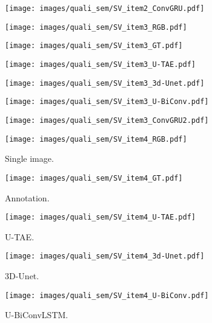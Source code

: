 \begin{figure*}
\begin{subfigure}{0.16\textwidth}
        \end{subfigure}
\hfill
        \begin{subfigure}{0.16\textwidth}
        \texttt{[image: images/quali\_sem/SV\_item2\_ConvGRU.pdf]}
        \end{subfigure}
\vfill
\begin{subfigure}{0.16\textwidth}
        \centering
        \texttt{[image: images/quali\_sem/SV\_item3\_RGB.pdf]}
        \end{subfigure}
    \hfill
        \begin{subfigure}{0.16\textwidth}
        \texttt{[image: images/quali\_sem/SV\_item3\_GT.pdf]}
        \end{subfigure}
    \hfill
        \begin{subfigure}{0.16\textwidth}
        \texttt{[image: images/quali\_sem/SV\_item3\_U-TAE.pdf]}
        \end{subfigure}
    \hfill
        \begin{subfigure}{0.16\textwidth}
        \texttt{[image: images/quali\_sem/SV\_item3\_3d-Unet.pdf]}
        \end{subfigure}
    \hfill
        \begin{subfigure}{0.16\textwidth}
        \texttt{[image: images/quali\_sem/SV\_item3\_U-BiConv.pdf]}
        \end{subfigure}
\hfill
        \begin{subfigure}{0.16\textwidth}
        \texttt{[image: images/quali\_sem/SV\_item3\_ConvGRU2.pdf]}
        \end{subfigure}
\vfill
\begin{subfigure}{0.16\textwidth}
        \centering
        \texttt{[image: images/quali\_sem/SV\_item4\_RGB.pdf]}
        \caption{Single image.}
        \label{fig:sem:rgb}
        \end{subfigure}
    \hfill
        \begin{subfigure}{0.16\textwidth}
        \texttt{[image: images/quali\_sem/SV\_item4\_GT.pdf]}
        \caption{Annotation.}
        \label{fig:sem:gt}
        \end{subfigure}
    \hfill
        \begin{subfigure}{0.16\textwidth}
        \texttt{[image: images/quali\_sem/SV\_item4\_U-TAE.pdf]}
        \caption{U-TAE.}
        \label{fig:sem:ours}
        \end{subfigure}
    \hfill
        \begin{subfigure}{0.16\textwidth}
        \texttt{[image: images/quali\_sem/SV\_item4\_3d-Unet.pdf]}
        \caption{3D-Unet.}
        \label{fig:sem:3d}
        \end{subfigure}
    \hfill
        \begin{subfigure}{0.16\textwidth}
        \texttt{[image: images/quali\_sem/SV\_item4\_U-BiConv.pdf]}
        \caption{U-BiConvLSTM.}
        \label{fig:sem:ubc}


\end{subfigure}
\end{figure*}
